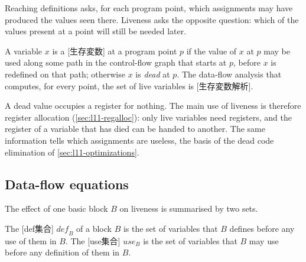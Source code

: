 \documentclass[../main.tex]{subfiles}
\begin{document}
Reaching definitions asks, for each program point, which assignments
may have produced the values seen there.
Liveness asks the opposite question: which of the values present at a
point will still be needed later.

\begin{definition}
  \label{def:l11-live}
  A variable $x$ is a [生存変数] at a program point
  $p$ if the value of $x$ at $p$ may be used along some path in the
  control-flow graph that starts at $p$, before $x$ is redefined on that
  path; otherwise $x$ is \emph{dead} at $p$.  The data-flow analysis
  that computes, for every point, the set of live variables is
  [生存変数解析].
\end{definition}

%
A dead value occupies a register for nothing.  The main use of liveness
is therefore register allocation (\cref{sec:l11-regalloc}): only live
variables need registers, and the register of a variable that has died
can be handed to another.  The same information tells which
assignments are useless, the basis of the dead code elimination of
\cref{sec:l11-optimizations}.

\subsection{Data-flow equations}

The effect of one basic block $B$ on liveness is summarised by two sets.

\begin{definition}
  \label{def:l11-def-use}
  The [def集合] $\mathit{def}_B$ of a block $B$ is the set
  of variables that $B$ defines before any use of them in $B$.  The
  [use集合] $\mathit{use}_B$ is the set of variables that
  $B$ may use before any definition of them in $B$.
\end{definition}
\end{document}
